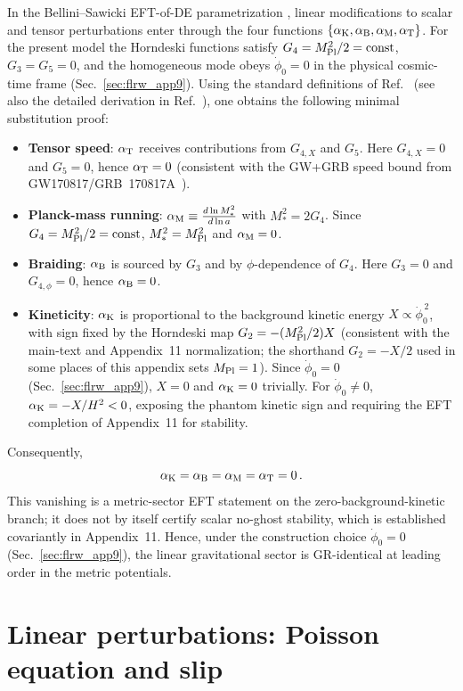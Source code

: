 \documentclass[11pt]{article}
\newcommand{\Mpl}{M_{\rm Pl}}
\newcommand{\aB}{\alpha_{\rm B}}
\newcommand{\aK}{\alpha_{\rm K}}
\newcommand{\aM}{\alpha_{\rm M}}
\newcommand{\aT}{\alpha_{\rm T}}
\begin{document}
In the Bellini--Sawicki EFT-of-DE parametrization \cite{BelliniSawicki2014}, linear
modifications to scalar and tensor perturbations enter through the four functions
$\{\aK,\aB,\aM,\aT\}$. For the present model the Horndeski functions satisfy
$G_4=\Mpl^2/2=\mathrm{const}$, $G_3=G_5=0$, and the homogeneous mode obeys
$\dot\phi_0=0$ in the physical cosmic-time frame (Sec.~\ref{sec:flrw_app9}). Using the
standard definitions of Ref.~\cite{BelliniSawicki2014} (see also the detailed
derivation in Ref.~\cite{Lotishvili2026}), one obtains the following minimal
substitution proof:
\begin{itemize}
\item \textbf{Tensor speed}: $\aT$ receives contributions from $G_{4,X}$ and $G_5$. Here
$G_{4,X}=0$ and $G_5=0$, hence $\aT=0$ (consistent with the GW+GRB speed bound
from GW170817/GRB~170817A~\cite{LIGO_GW170817}).
\item \textbf{Planck-mass running}: $\aM\equiv \frac{d\ln M_*^2}{d\ln a}$ with
$M_*^2=2G_4$. Since $G_4=\Mpl^2/2=\mathrm{const}$, $M_*^2=\Mpl^2$ and $\aM=0$.
\item \textbf{Braiding}: $\aB$ is sourced by $G_3$ and by $\phi$-dependence of $G_4$.
Here $G_3=0$ and $G_{4,\phi}=0$, hence $\aB=0$.
\item \textbf{Kineticity}: $\aK$ is proportional to the background kinetic energy
$X\propto \dot\phi_0^{\,2}$, with sign fixed by the Horndeski map $G_2=-(\Mpl^2/2)X$ (consistent with the main-text and Appendix~11 normalization; the shorthand $G_2=-X/2$ used in some places of this appendix sets $\Mpl=1$).
Since $\dot\phi_0=0$ (Sec.~\ref{sec:flrw_app9}), $X=0$ and $\aK=0$ trivially.
For $\dot\phi_0\neq 0$, $\aK=-X/H^2<0$, exposing the phantom kinetic sign and
requiring the EFT completion of Appendix~11 for stability.
\end{itemize}
Consequently,
\begin{equation}
\aK=\aB=\aM=\aT=0\,.
\label{eq:alphazero}
\end{equation}
This vanishing is a metric-sector EFT statement on the
zero-background-kinetic branch; it does not by itself certify
scalar no-ghost stability, which is established covariantly in
Appendix~11.
Hence, under the construction choice $\dot\phi_0=0$ (Sec.~\ref{sec:flrw_app9}),
the linear gravitational sector is GR-identical at leading order in the metric
potentials.

\section{Linear perturbations: Poisson equation and slip}
\label{sec:linear}
\end{document}
